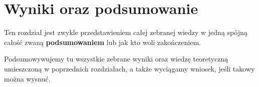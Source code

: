 \chapter{Wyniki oraz podsumowanie}
\label{chap:wyniki-oraz-podsumowanie}

Ten rozdział jest zwykle przedstawieniem całej zebranej wiedzy w jedną spójną całość zwaną \textbf{podsumowaniem} lub jak kto woli zakończeniem.

Podsumowywujemy tu wszystkie zebrane wyniki oraz wiedzę teoretyczną umieszczoną w poprzednich rozdziałach, a także wyciągamy wniosek, jeśli takowy można wysnuć.

